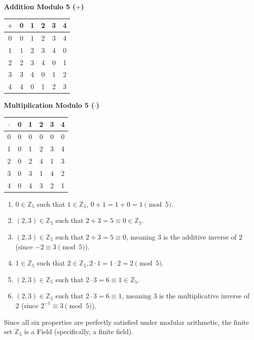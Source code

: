 \documentclass[11pt, a4paper]{article}
\begin{document}
	\begin{center}
		\begin{minipage}[t]{0.45\textwidth}
			\centering
			\textbf{Addition Modulo 5 ($+$)} \\[0.5em]
			\begin{tabular}{c|ccccc}
				$+$ & 0 & 1 & 2 & 3 & 4 \\ \hline
				0   & 0 & 1 & 2 & 3 & 4 \\
				1   & 1 & 2 & 3 & 4 & 0 \\
				2   & 2 & 3 & 4 & 0 & 1 \\
				3   & 3 & 4 & 0 & 1 & 2 \\
				4   & 4 & 0 & 1 & 2 & 3 \\
			\end{tabular}
		\end{minipage}
		\hfill %
		\begin{minipage}[t]{0.45\textwidth}
			\centering
			\textbf{Multiplication Modulo 5 ($\cdot$)} \\[0.5em]
			\begin{tabular}{c|ccccc}
				$\cdot$ & 0 & 1 & 2 & 3 & 4 \\ \hline
				0       & 0 & 0 & 0 & 0 & 0 \\
				1       & 0 & 1 & 2 & 3 & 4 \\
				2       & 0 & 2 & 4 & 1 & 3 \\
				3       & 0 & 3 & 1 & 4 & 2 \\
				4       & 0 & 4 & 3 & 2 & 1 \\
			\end{tabular}
		\end{minipage}
	\end{center}
	
	\begin{enumerate}
		\item $0 \in \mathbb{Z}_5$ such that $1 \in \mathbb{Z}_5$, $0 + 1 = 1 + 0 = 1 \pmod 5$. 
		\item $(2,3) \in \mathbb{Z}_5$ such that $2 + 3 = 5 \equiv 0 \in \mathbb{Z}_5$.
		\item $(2, 3) \in \mathbb{Z}_5$ such that $2 + 3 = 5 \equiv 0$, meaning $3$ is the additive inverse of $2$ (since $-2 \equiv 3 \pmod 5$).
		\item $1 \in \mathbb{Z}_5$ such that $2 \in \mathbb{Z}_5, 2 \cdot 1 = 1 \cdot 2 = 2 \pmod 5$.
		\item $(2,3) \in \mathbb{Z}_5$ such that $2 \cdot 3 = 6 \equiv 1 \in \mathbb{Z}_5$.
		\item $(2, 3) \in \mathbb{Z}_5$ such that $2 \cdot 3 = 6 \equiv 1$, meaning $3$ is the multiplicative inverse of $2$ (since $2^{-1} \equiv 3 \pmod 5$).
	\end{enumerate}
	Since all six properties are perfectly satisfied under modular arithmetic, the finite set $\mathbb{Z}_5$ is a Field (specifically, a finite field).
	
\end{document}
